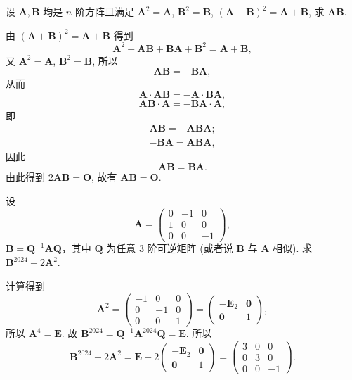 \documentclass[../../main.tex]{subfiles}%
\begin{document}
\begin{example}
设 $\boldsymbol{A},\boldsymbol{B}$ 均是 $n$ 阶方阵且满足 $\boldsymbol{A}^2 = \boldsymbol{A}$, $\boldsymbol{B}^2 = \boldsymbol{B}$, $(\boldsymbol{A} + \boldsymbol{B})^2 = \boldsymbol{A} + \boldsymbol{B}$, 求 $\boldsymbol{AB}$.
\end{example}
\begin{solution}

由 $(\boldsymbol{A} + \boldsymbol{B})^2 = \boldsymbol{A} + \boldsymbol{B}$ 得到
\[
\boldsymbol{A}^2 + \boldsymbol{AB} + \boldsymbol{BA} + \boldsymbol{B}^2 = \boldsymbol{A} + \boldsymbol{B},
\]
又 $\boldsymbol{A}^2 = \boldsymbol{A}$, $\boldsymbol{B}^2 = \boldsymbol{B}$, 所以
\[
\boldsymbol{AB} = -\boldsymbol{BA},
\]
从而
\[
\boldsymbol{A} \cdot \boldsymbol{AB} = -\boldsymbol{A} \cdot \boldsymbol{BA},
\]
\[
\boldsymbol{AB} \cdot \boldsymbol{A} = -\boldsymbol{BA} \cdot \boldsymbol{A},
\]
即
\begin{gather*}
\boldsymbol{AB}=-\boldsymbol{ABA};
\\
-\boldsymbol{BA}=\boldsymbol{ABA},
\end{gather*}
因此
\[
\boldsymbol{AB} = \boldsymbol{BA}.
\]
由此得到 $2\boldsymbol{AB} = \boldsymbol{O}$, 故有 $\boldsymbol{AB} = \boldsymbol{O}$.

\end{solution}

\begin{example}
设
\[
\boldsymbol{A} = \begin{pmatrix} 0 & -1 & 0 \\ 1 & 0 & 0 \\ 0 & 0 & -1 \end{pmatrix},
\]
\(\boldsymbol{B} = \boldsymbol{Q}^{-1}\boldsymbol{A}\boldsymbol{Q}\)，其中 \(\boldsymbol{Q}\) 为任意 3 阶可逆矩阵 (或者说 \(\boldsymbol{B}\) 与 \(\boldsymbol{A}\) 相似). 求 \(\boldsymbol{B}^{2024} - 2\boldsymbol{A}^2\).
\end{example}
\begin{solution}

计算得到
\[
\boldsymbol{A}^2 = \begin{pmatrix} -1 & 0 & 0 \\ 0 & -1 & 0 \\ 0 & 0 & 1 \end{pmatrix} = \begin{pmatrix} -\boldsymbol{E}_2 & \boldsymbol{0} \\ \boldsymbol{0} & 1 \end{pmatrix},
\]
所以 \(\boldsymbol{A}^4 = \boldsymbol{E}\). 故 \(\boldsymbol{B}^{2024} = \boldsymbol{Q}^{-1}\boldsymbol{A}^{2024}\boldsymbol{Q} = \boldsymbol{E}\). 所以
\[
\boldsymbol{B}^{2024} - 2\boldsymbol{A}^2 = \boldsymbol{E} - 2\begin{pmatrix} -\boldsymbol{E}_2 & \boldsymbol{0} \\ \boldsymbol{0} & 1 \end{pmatrix} = \begin{pmatrix} 3 & 0 & 0 \\ 0 & 3 & 0 \\ 0 & 0 & -1 \end{pmatrix}.
\]

\end{solution}
\end{document}
